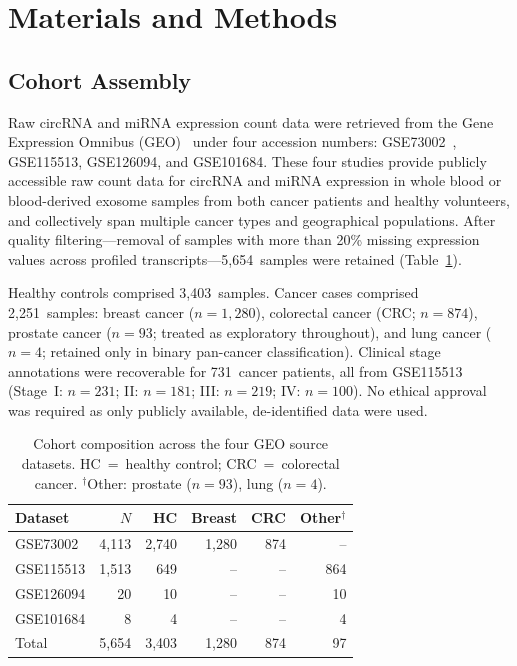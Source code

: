 \documentclass[12pt]{article}
\begin{document}
\section{Materials and Methods}

\subsection{Cohort Assembly}

Raw circRNA and miRNA expression count data were retrieved from the Gene
Expression Omnibus (GEO)~\citep{barrett2013} under four accession
numbers: GSE73002~\citep{li2018}, GSE115513, GSE126094, and GSE101684.
These four studies provide publicly accessible raw count data for
circRNA and miRNA expression in whole blood or blood-derived exosome
samples from both cancer patients and healthy volunteers, and
collectively span multiple cancer types and geographical populations.
After quality filtering---removal of samples with more than 20\%
missing expression values across profiled transcripts---5,654~samples
were retained (Table~\ref{tab:cohort}).

Healthy controls comprised 3,403~samples. Cancer cases comprised
2,251~samples: breast cancer ($n=1{,}280$), colorectal cancer (CRC;
$n=874$), prostate cancer ($n=93$; treated as exploratory throughout),
and lung cancer ($n=4$; retained only in binary pan-cancer
classification). Clinical stage annotations were recoverable for
731~cancer patients, all from GSE115513 (Stage~I: $n=231$; II:
$n=181$; III: $n=219$; IV: $n=100$). No ethical approval was required
as only publicly available, de-identified data were used.

\begin{table}[H]
\centering
\caption{Cohort composition across the four GEO source datasets.
HC~=~healthy control; CRC~=~colorectal cancer.
$^\dagger$Other: prostate ($n=93$), lung ($n=4$).}
\label{tab:cohort}
\begin{tabular}{lrrrrr}
\toprule
Dataset & $N$ & HC & Breast & CRC & Other$^\dagger$ \\
\midrule
GSE73002  & 4,113 & 2,740 & 1,280 & 874 & -- \\
GSE115513 & 1,513 &   649 &    -- &  -- & 864 \\
GSE126094 &    20 &    10 &    -- &  -- &  10 \\
GSE101684 &     8 &     4 &    -- &  -- &   4 \\
\midrule
Total     & 5,654 & 3,403 & 1,280 & 874 &  97 \\
\bottomrule
\end{tabular}
\end{table}
\end{document}
